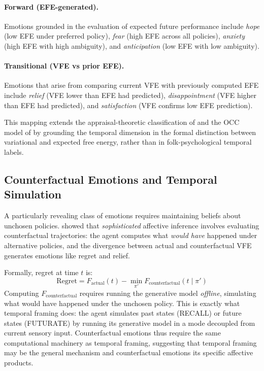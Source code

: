\documentclass[11pt,a4paper]{article}
\begin{document}
\paragraph{Forward (EFE-generated).} Emotions grounded in the evaluation of expected future performance include \emph{hope} (low EFE under preferred policy), \emph{fear} (high EFE across all policies), \emph{anxiety} (high EFE with high ambiguity), and \emph{anticipation} (low EFE with low ambiguity).

\paragraph{Transitional (VFE vs prior EFE).} Emotions that arise from comparing current VFE with previously computed EFE include \emph{relief} (VFE lower than EFE had predicted), \emph{disappointment} (VFE higher than EFE had predicted), and \emph{satisfaction} (VFE confirms low EFE prediction).

This mapping extends the appraisal-theoretic classification of \citet{smith1985patterns} and the OCC model of \citet{ortony1988cognitive} by grounding the temporal dimension in the formal distinction between variational and expected free energy, rather than in folk-psychological temporal labels.

\subsection{Counterfactual Emotions and Temporal Simulation}\label{sec:counterfactual_emotions}

A particularly revealing class of emotions requires maintaining beliefs about unchosen policies. \citet{hesp2020sophisticated} showed that \emph{sophisticated} affective inference involves evaluating counterfactual trajectories: the agent computes what \emph{would have} happened under alternative policies, and the divergence between actual and counterfactual VFE generates emotions like regret and relief.

Formally, regret at time $t$ is:
\begin{equation}
    \text{Regret} = F_{\text{actual}}(t) - \min_{\pi'} F_{\text{counterfactual}}(t \mid \pi')
\end{equation}
Computing $F_{\text{counterfactual}}$ requires running the generative model \emph{offline}, simulating what would have happened under the unchosen policy. This is exactly what temporal framing does: the agent simulates past states (RECALL) or future states (FUTURATE) by running its generative model in a mode decoupled from current sensory input. Counterfactual emotions thus require the same computational machinery as temporal framing, suggesting that temporal framing may be the general mechanism and counterfactual emotions its specific affective products.
\end{document}
